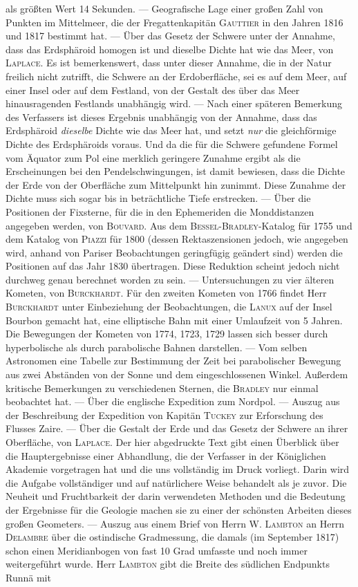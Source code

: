 als größten Wert 14 Sekunden. --- Geografische Lage einer großen Zahl von Punkten im Mittelmeer, die der Fregattenkapitän \textsc{Gauttier} in den Jahren 1816 und 1817 bestimmt hat. --- Über das Gesetz der Schwere unter der Annahme, dass das Erdsphäroid homogen ist und dieselbe Dichte hat wie das Meer, von \textsc{Laplace}. Es ist bemerkenswert, dass unter dieser Annahme, die in der Natur freilich nicht zutrifft, die Schwere an der Erdoberfläche, sei es auf dem Meer, auf einer Insel oder auf dem Festland, von der Gestalt des über das Meer hinausragenden Festlands unabhängig wird. --- Nach einer späteren Bemerkung des Verfassers ist dieses Ergebnis unabhängig von der Annahme, dass das Erdsphäroid \emph{dieselbe} Dichte wie das Meer hat, und setzt \emph{nur} die gleichförmige Dichte des Erdsphäroids voraus. Und da die für die Schwere gefundene Formel vom Äquator zum Pol eine merklich geringere Zunahme ergibt als die Erscheinungen bei den Pendelschwingungen, ist damit bewiesen, dass die Dichte der Erde von der Oberfläche zum Mittelpunkt hin zunimmt. Diese Zunahme der Dichte muss sich sogar bis in beträchtliche Tiefe erstrecken. --- Über die Positionen der Fixsterne, für die in den Ephemeriden die Monddistanzen angegeben werden, von \textsc{Bouvard}. Aus dem \textsc{Bessel}-\textsc{Bradley}-Katalog für 1755 und dem Katalog von \textsc{Piazzi} für 1800 (dessen Rektaszensionen jedoch, wie angegeben wird, anhand von Pariser Beobachtungen geringfügig geändert sind) werden die Positionen auf das Jahr 1830 übertragen. Diese Reduktion scheint jedoch nicht durchweg genau berechnet worden zu sein. --- Untersuchungen zu vier älteren Kometen, von \textsc{Burckhardt}. Für den zweiten Kometen von 1766 findet Herr \textsc{Burckhardt} unter Einbeziehung der Beobachtungen, die \textsc{Lanux} auf der Insel Bourbon gemacht hat, eine elliptische Bahn mit einer Umlaufzeit von 5 Jahren. Die Bewegungen der Kometen von 1774, 1723, 1729 lassen sich besser durch hyperbolische als durch parabolische Bahnen darstellen. --- Vom selben Astronomen eine Tabelle zur Bestimmung der Zeit bei parabolischer Bewegung aus zwei Abständen von der Sonne und dem eingeschlossenen Winkel. Außerdem kritische Bemerkungen zu verschiedenen Sternen, die \textsc{Bradley} nur einmal beobachtet hat. --- Über die englische Expedition zum Nordpol. --- Auszug aus der Beschreibung der Expedition von Kapitän \textsc{Tuckey} zur Erforschung des Flusses Zaire. --- Über die Gestalt der Erde und das Gesetz der Schwere an ihrer Oberfläche, von \textsc{Laplace}. Der hier abgedruckte Text gibt einen Überblick über die Hauptergebnisse einer Abhandlung, die der Verfasser in der Königlichen Akademie vorgetragen hat und die uns vollständig im Druck vorliegt. Darin wird die Aufgabe vollständiger und auf natürlichere Weise behandelt als je zuvor. Die Neuheit und Fruchtbarkeit der darin verwendeten Methoden und die Bedeutung der Ergebnisse für die Geologie machen sie zu einer der schönsten Arbeiten dieses großen Geometers. --- Auszug aus einem Brief von Herrn W. \textsc{Lambton} an Herrn \textsc{Delambre} über die ostindische Gradmessung, die damals (im September 1817) schon einen Meridianbogen von fast 10 Grad umfasste und noch immer weitergeführt wurde. Herr \textsc{Lambton} gibt die Breite des südlichen Endpunkts Runnä mit 